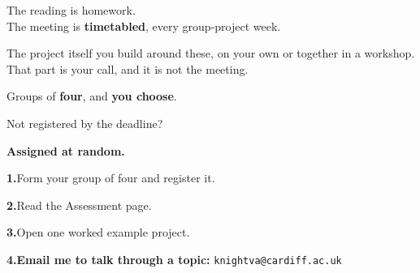 \vspace{1.0cm}

\begin{center}
{\LARGE The reading is homework.\\[0.4em]
 The meeting is \textbf{timetabled}, every group-project week.}
\end{center}

\vspace{0.5em}

\begin{center}
{\large\color{inkgrey} The project itself you build around these, on your
own or together in a workshop. That part is your call, and it is not the
meeting.}
\end{center}

\newpage
{}

\vspace{1.6cm}

\begin{center}
{\LARGE Groups of \textbf{four}, and \textbf{you choose}.}

\vspace{1.6cm}

{\LARGE Not registered by the deadline?}

\vspace{0.7em}

{\LARGE\bfseries\color{inkred} Assigned at random.}
\end{center}

\newpage
{}

\vspace{0.9cm}

{\LARGE
\textbf{\color{inkblue}1.}\quad Form your group of four and register it.

\vspace{0.9em}

\textbf{\color{inkblue}2.}\quad Read the Assessment page.

\vspace{0.9em}

\textbf{\color{inkblue}3.}\quad Open one worked example project.

\vspace{0.9em}

\textbf{\color{inkteal}4.}\quad \textbf{Email me to talk through a
topic:} \texttt{knightva@cardiff.ac.uk}}

\vspace{1.1cm}

